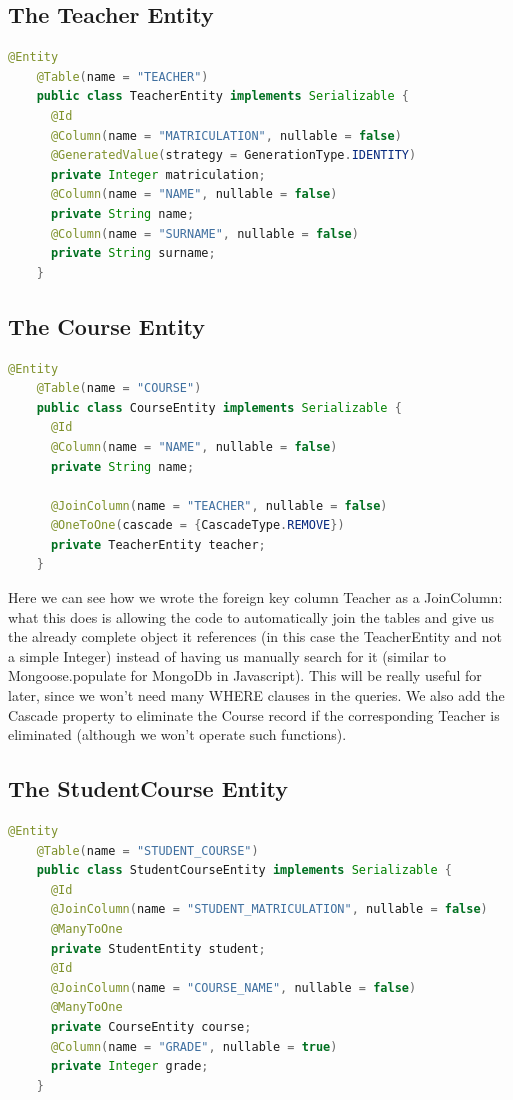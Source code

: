\documentclass[12pt, a4paper]{article}
\begin{document}
  \pagebreak
  \subsection{The Teacher Entity}
  \begin{lstlisting}[language=java, caption={The Teacher Entity}]
    @Entity
    @Table(name = "TEACHER")
    public class TeacherEntity implements Serializable {
      @Id
      @Column(name = "MATRICULATION", nullable = false)
      @GeneratedValue(strategy = GenerationType.IDENTITY)
      private Integer matriculation;
      @Column(name = "NAME", nullable = false)
      private String name;
      @Column(name = "SURNAME", nullable = false)
      private String surname;
    }
  \end{lstlisting}

  \subsection{The Course Entity}
  \begin{lstlisting}[language=java, caption={The Course Entity}]
    @Entity
    @Table(name = "COURSE")
    public class CourseEntity implements Serializable {
      @Id
      @Column(name = "NAME", nullable = false)
      private String name;

      @JoinColumn(name = "TEACHER", nullable = false)
      @OneToOne(cascade = {CascadeType.REMOVE})
      private TeacherEntity teacher;
    }
  \end{lstlisting}

  Here we can see how we wrote the foreign key column Teacher as a JoinColumn: what this does is allowing the code to automatically join the tables and give us the already complete object it references (in this case the TeacherEntity and not a simple Integer) instead of having us manually search for it (similar to Mongoose.populate for MongoDb in Javascript). This will be really useful for later, since we won't need many WHERE clauses in the queries. We also add the Cascade property to eliminate the Course record if the corresponding Teacher is eliminated (although we won't operate such functions).

  \pagebreak
  \subsection{The StudentCourse Entity}
  \begin{lstlisting}[language=java, caption={The StudentCourse Entity}]
    @Entity
    @Table(name = "STUDENT_COURSE")
    public class StudentCourseEntity implements Serializable {
      @Id
      @JoinColumn(name = "STUDENT_MATRICULATION", nullable = false)
      @ManyToOne
      private StudentEntity student;
      @Id
      @JoinColumn(name = "COURSE_NAME", nullable = false)
      @ManyToOne
      private CourseEntity course;
      @Column(name = "GRADE", nullable = true)
      private Integer grade;
    }
  \end{lstlisting}
\end{document}
